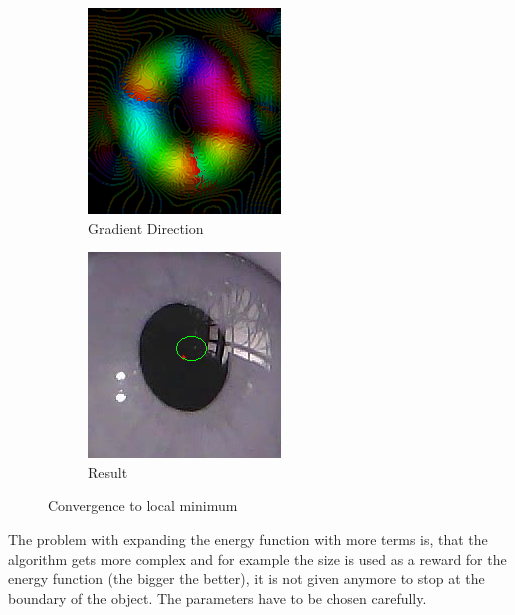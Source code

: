 \begin{figure}[h]
\begin{subfigure}{0.5\textwidth}
        \includegraphics[width=0.7\linewidth]{plots/eye_dataset/direction.png}
        \caption{Gradient Direction}
    \end{subfigure}%
    \hfill
    \begin{subfigure}{0.5\textwidth}
        \centering
        \includegraphics[width=0.7\linewidth]{plots/eye_dataset/result.png}
        \caption{Result}
    \end{subfigure}
    \caption{Convergence to local minimum}
    \label{fig:ac_ellipse_gradient}
\end{figure}
The problem with expanding the energy function with more terms is, that the algorithm gets more complex and for example the size is used as a reward for the energy function (the bigger the better), it is not given anymore to stop at the boundary of the object. The parameters have to be chosen carefully.

